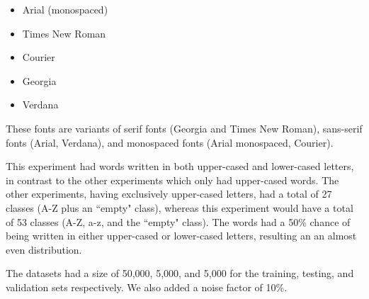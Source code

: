 \begin{itemize}
    \item Arial (monospaced)
    \item Times New Roman
    \item Courier
    \item Georgia
    \item Verdana
\end{itemize}

These fonts are variants of serif fonts (Georgia and Times New Roman), sans-serif fonts (Arial, Verdana), and monospaced fonts (Arial monospaced, Courier).

This experiment had words written in both upper-cased and lower-cased letters, in contrast to the other experiments which only had upper-cased words. The other experiments, having exclusively upper-cased letters, had a total of 27 classes (A-Z plus an ``empty" class), whereas this experiment would have a total of 53 classes (A-Z, a-z, and the ``empty" class). The words had a 50\% chance of being written in either upper-cased or lower-cased letters, resulting an an almost even distribution.

The datasets had a size of 50,000, 5,000, and 5,000 for the training, testing, and validation sets respectively. We also added a noise factor of 10\%.